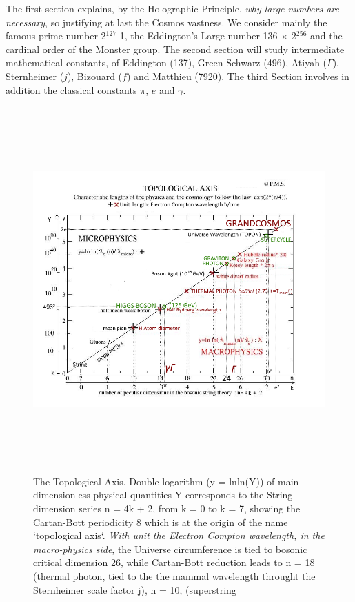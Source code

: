 \documentclass[twoside,draft]{article}
\begin{document}
\begin{sloppypar}
{The first section explains, by the Holographic Principle, \textit{why large numbers are necessary}, so justifying at last the Cosmos vastness. We consider mainly the famous prime number 2$^{127}\!$-1, the Eddington's Large number 136 $\times$ 2$^{256}\!$ and the cardinal order of the Monster group. The second section will study intermediate mathematical constants, of Eddington (137), Green-Schwarz (496), Atiyah ($\Gamma$), Sternheimer ($j$), Bizouard ($f$) and Matthieu (7920). The third Section involves in addition the classical constants $\pi$, $e$ and $\gamma$. 



\begin{figure}
\centering
\includegraphics[width=\textwidth,height=14cm]{./figures/figure}
\caption{The Topological Axis. Double logarithm (y = lnln(Y)) of main dimensionless physical quantities 
Y corresponds to the String dimension series n = 4k + 2, from k = 0 to k = 7, showing the Cartan-Bott
periodicity 8 \cite{Polchinski} which is at the origin of the name `topological axis`. 
\textit{With unit the Electron Compton wavelength, in the macro-physics side}, the Universe circumference 
    is tied to bosonic critical dimension 26, while Cartan-Bott reduction leads to n = 18 (thermal photon, 
    tied to the the mammal wavelength throught the Sternheimer scale factor j), n = 10, (superstring 
}
\end{figure}}
\end{sloppypar}
\end{document}
